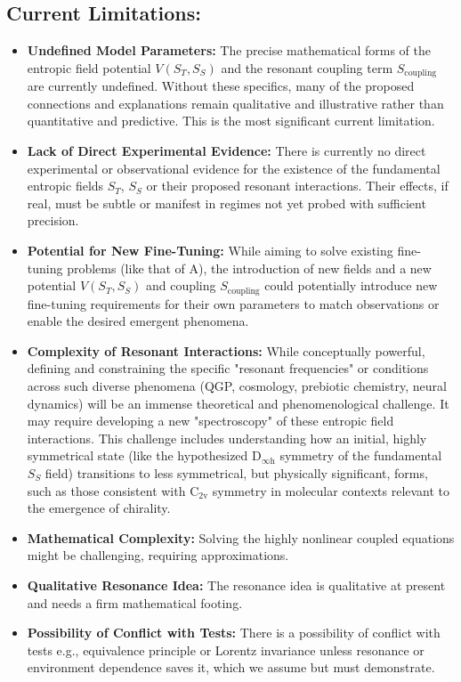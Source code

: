\documentclass[11pt,a4paper]{article} %
\newcommand{\ST}{S_T}
\newcommand{\SSp}{S_S} %
\newcommand{\Scoupling}{S_{\text{coupling}}}
\begin{document}
\subsection{Current Limitations:}
\begin{itemize}
    \item \textbf{Undefined Model Parameters:} The precise mathematical forms of the entropic field potential $V(\ST,\SSp)$ and the resonant coupling term $\Scoupling$ are currently undefined. Without these specifics, many of the proposed connections and explanations remain qualitative and illustrative rather than quantitative and predictive. This is the most significant current limitation.
    \item \textbf{Lack of Direct Experimental Evidence:} There is currently no direct experimental or observational evidence for the existence of the fundamental entropic fields $\ST$, $\SSp$ or their proposed resonant interactions. Their effects, if real, must be subtle or manifest in regimes not yet probed with sufficient precision.
    \item \textbf{Potential for New Fine-Tuning:} While aiming to solve existing fine-tuning problems (like that of A), the introduction of new fields and a new potential $V(\ST,\SSp)$ and coupling $\Scoupling$ could potentially introduce new fine-tuning requirements for their own parameters to match observations or enable the desired emergent phenomena.
    \item \textbf{Complexity of Resonant Interactions:} While conceptually powerful, defining and constraining the specific "resonant frequencies" or conditions across such diverse phenomena (QGP, cosmology, prebiotic chemistry, neural dynamics) will be an immense theoretical and phenomenological challenge. It may require developing a new "spectroscopy" of these entropic field interactions. This challenge includes understanding how an initial, highly symmetrical state (like the hypothesized $\text{D}_{\infty\text{h}}$ symmetry of the fundamental $\SSp$ field) transitions to less symmetrical, but physically significant, forms, such as those consistent with $\text{C}_{2\text{v}}$ symmetry in molecular contexts relevant to the emergence of chirality.
    \item \textbf{Mathematical Complexity:} Solving the highly nonlinear coupled equations might be challenging, requiring approximations.
    \item \textbf{Qualitative Resonance Idea:} The resonance idea is qualitative at present and needs a firm mathematical footing.
    \item \textbf{Possibility of Conflict with Tests:} There is a possibility of conflict with tests e.g., equivalence principle or Lorentz invariance unless resonance or environment dependence saves it, which we assume but must demonstrate.
\end{itemize}
\end{document}
